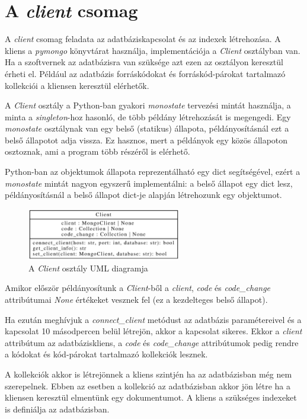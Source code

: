 \section{A \emph{client} csomag}

A \emph{client} csomag feladata az adatbáziskapcsolat és az indexek létrehozása.
A kliens a \emph{pymongo} könyvtárat használja, implementációja a \emph{Client} osztályban van.
Ha a szoftvernek az adatbázisra van szüksége azt ezen az osztályon keresztül érheti el.
Például az adatbázis forráskódokat és forráskód-párokat tartalmazó kollekciói a kliensen
keresztül elérhetők.

A \emph{Client} osztály a Python-ban gyakori \emph{monostate} \cite{monostatePattern}
tervezési mintát használja, a minta a \emph{singleton}-hoz hasonló,
de több példány létrehozását is megengedi.
Egy \emph{monostate} osztálynak van egy belső (statikus) állapota,
példányosításnál ezt a belső állapotot adja vissza.
Ez hasznos, mert a példányok egy közös állapoton osztoznak, ami a program több részéről is elérhető.

Python-ban az objektumok állapota reprezentálható egy dict segítségével,
ezért a \emph{monostate} mintát nagyon egyszerű implementálni:
a belső állapot egy dict lesz, példányosításnál a belső állapot dict-je alapján létrehozunk egy objektumot.

\begin{figure}[H]
	\centering
	\includegraphics[width=0.6\textwidth]{images/uml/Client.eps}
	\caption{A \emph{Client} osztály UML diagramja}
\end{figure}

Amikor először példányosítunk a \emph{Client}-ből a \emph{client}, \emph{code} és \emph{code\_change}
attribútumai \emph{None} értékeket vesznek fel (ez a kezdelteges belső állapot).

Ha ezután meghívjuk a \emph{connect\_client} metódust az adatbázis paramétereivel
és a kapcsolat 10 másodpercen belül létrejön, akkor a kapcsolat sikeres.
Ekkor
a \emph{client} attribútum az adatbáziskliens,
a \emph{code} és \emph{code\_change} attribútumok pedig rendre
a kódokat és kód-párokat tartalmazó kollekciók lesznek.

A kollekciók akkor is létrejönnek a kliens szintjén ha az adatbázisban még nem szerepelnek.
Ebben az esetben a kollekció az adatbázisban akkor jön létre ha a kliensen keresztül elmentünk egy dokumentumot.
A kliens a szükséges indexeket is definiálja az adatbázisban.

